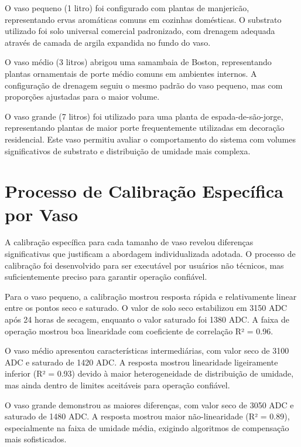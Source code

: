 O vaso pequeno (1 litro) foi configurado com plantas de manjericão, representando ervas aromáticas comuns em cozinhas domésticas. O substrato utilizado foi solo universal comercial padronizado, com drenagem adequada através de camada de argila expandida no fundo do vaso.

O vaso médio (3 litros) abrigou uma samambaia de Boston, representando plantas ornamentais de porte médio comuns em ambientes internos. A configuração de drenagem seguiu o mesmo padrão do vaso pequeno, mas com proporções ajustadas para o maior volume.

O vaso grande (7 litros) foi utilizado para uma planta de espada-de-são-jorge, representando plantas de maior porte frequentemente utilizadas em decoração residencial. Este vaso permitiu avaliar o comportamento do sistema com volumes significativos de substrato e distribuição de umidade mais complexa.


\section{Processo de Calibração Específica por Vaso}

A calibração específica para cada tamanho de vaso revelou diferenças significativas que justificam a abordagem individualizada adotada. O processo de calibração foi desenvolvido para ser executável por usuários não técnicos, mas suficientemente preciso para garantir operação confiável.

Para o vaso pequeno, a calibração mostrou resposta rápida e relativamente linear entre os pontos seco e saturado. O valor de solo seco estabilizou em 3150 ADC após 24 horas de secagem, enquanto o valor saturado foi 1380 ADC. A faixa de operação mostrou boa linearidade com coeficiente de correlação R² = 0.96.

O vaso médio apresentou características intermediárias, com valor seco de 3100 ADC e saturado de 1420 ADC. A resposta mostrou linearidade ligeiramente inferior (R² = 0.93) devido à maior heterogeneidade de distribuição de umidade, mas ainda dentro de limites aceitáveis para operação confiável.

O vaso grande demonstrou as maiores diferenças, com valor seco de 3050 ADC e saturado de 1480 ADC. A resposta mostrou maior não-linearidade (R² = 0.89), especialmente na faixa de umidade média, exigindo algoritmos de compensação mais sofisticados.

